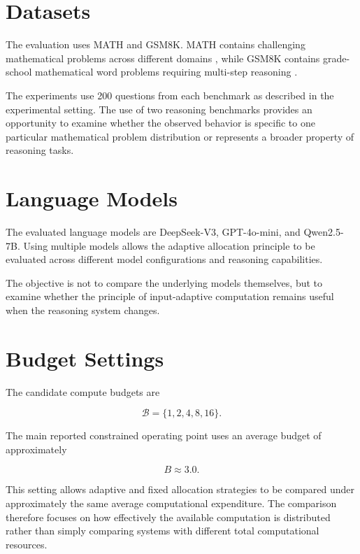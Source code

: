 \documentclass[12pt,a4paper,titlepage]{report}
\begin{document}
\section{Datasets}

The evaluation uses MATH and GSM8K. MATH contains challenging mathematical problems across different domains \cite{hendrycks2021math}, while GSM8K contains grade-school mathematical word problems requiring multi-step reasoning \cite{cobbe2021gsm8k}.

The experiments use 200 questions from each benchmark as described in the experimental setting. The use of two reasoning benchmarks provides an opportunity to examine whether the observed behavior is specific to one particular mathematical problem distribution or represents a broader property of reasoning tasks.

\section{Language Models}

The evaluated language models are DeepSeek-V3, GPT-4o-mini, and Qwen2.5-7B. Using multiple models allows the adaptive allocation principle to be evaluated across different model configurations and reasoning capabilities.

The objective is not to compare the underlying models themselves, but to examine whether the principle of input-adaptive computation remains useful when the reasoning system changes.

\section{Budget Settings}

The candidate compute budgets are

\begin{equation}
\mathcal{B}
=
\{1,2,4,8,16\}.
\end{equation}

The main reported constrained operating point uses an average budget of approximately

\begin{equation}
B\approx3.0.
\end{equation}

This setting allows adaptive and fixed allocation strategies to be compared under approximately the same average computational expenditure. The comparison therefore focuses on how effectively the available computation is distributed rather than simply comparing systems with different total computational resources.
\end{document}

